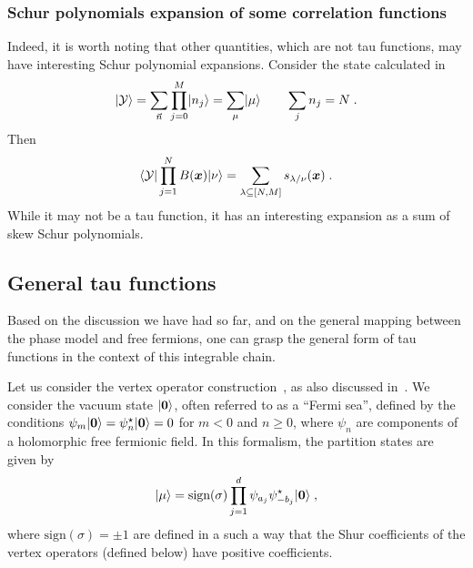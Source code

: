 \documentclass[a4paper,11pt]{amsart}
\begin{document}

\subsubsection{Schur polynomials expansion of some correlation functions}
Indeed, it is worth noting that other quantities, which are not tau
functions, may have interesting Schur polynomial expansions. Consider
the state calculated in~\cite{Bogoliubov2005}
\begin{equation}
  \lvert\mathcal{Y}\rangle =
 \sum_{\vec{n}} \prod_{j=0}^M \lvert n_j\rangle = \sum_\mu \lvert\mu\rangle \qquad \sum_j n_j = N\; .
\end{equation}
Then
\begin{equation}
 \langle\mathcal{Y}\rvert \prod_{j=1}^N B(\bm{x}) \lvert\nu\rangle = 
  \sum_{\lambda\subseteq [N,M]} s_{\lambda/\nu}(\bm{x})\; . 
\end{equation}
While it may not be a tau function, it has an interesting expansion as
a sum of skew Schur polynomials.


\subsection{General tau functions}
Based on the discussion we have had so far, and on the general mapping
between the phase model and free fermions, one can grasp the general
form of tau functions in the context of this integrable chain.

Let us consider the vertex operator construction~\cite{Okounkov2001},
as also discussed in~\cite{Alexandrov:2012tr, Wheeler:2010vmq}. We
consider the vacuum state \(\lvert\bm{0}\rangle\), often referred to as a
``Fermi sea'', defined by the conditions \(\psi_m\lvert\bm{0}\rangle =
\psi_n^\star\lvert\bm{0}\rangle =0 \) for \(m<0\) and \(n \geq 0\), where
\(\psi_n\) are components of a holomorphic free fermionic field. In
this formalism, the partition states are given by
\begin{equation}
  \lvert\mu\rangle = \textrm{sign}(\sigma) \prod_{j=1}^d \psi_{a_j} \psi^\star_{-b_j}\lvert\bm{0}\rangle\; ,
\end{equation}
where \(\textrm{sign}(\sigma) = \pm 1\) are defined in a such a way
that the Shur coefficients of the vertex operators (defined below)
have positive coefficients.
\end{document}
